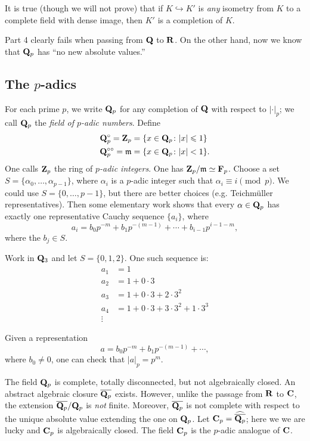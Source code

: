 It is true (though we will not prove) that if $K\hookrightarrow K'$ is 
\emph{any} isometry from $K$ to a complete field with dense image, then $K'$ is 
a completion of $K$. 

Part 4 clearly fails when passing from $\mathbf{Q}$ to $\mathbf{R}$. On the other hand, now 
we know that $\mathbf{Q}_p$ has ``no new absolute values.'' 





\subsection{The \texorpdfstring{$p$}{p}-adics}

For each prime $p$, we write $\mathbf{Q}_p$ for any completion of $\mathbf{Q}$ with respect 
to $|\cdot|_p$; we call $\mathbf{Q}_p$ the \emph{field of $p$-adic numbers}. Define 
\begin{align*}
  \mathbf{Q}_p^\circ = \mathbf{Z}_p &= \{x\in \mathbf{Q}_p\colon |x|\leqslant 1\} \\
  \mathbf{Q}_p^{\circ\circ} = \mathfrak{m} &= \{x\in \mathbf{Q}_p\colon |x|<1\} .
\end{align*}
One calls $\mathbf{Z}_p$ the ring of \emph{$p$-adic integers}. One has 
$\mathbf{Z}_p/\mathfrak{m}\simeq \mathbf{F}_p$. Choose a 
set $S=\{\alpha_0,\dots,\alpha_{p-1}\}$, where $\alpha_i$ is a $p$-adic integer 
such that $\alpha_i\equiv i\pmod p$. We could use $S=\{0,\dots,p-1\}$, but 
there are better choices (e.g. Teichm\"uller representatives). Then some 
elementary work shows that every $\alpha\in \mathbf{Q}_p$ has exactly one 
representative Cauchy sequence $\{a_i\}$, where 
\[
  a_i = b_0 p^{-m} + b_1 p^{-(m-1)} + \cdots + b_{i-1} p^{i-1-m} ,
\]
where the $b_j\in S$. 

\begin{example}
Work in $\mathbf{Q}_3$ and let $S=\{0,1,2\}$. One such sequence is: 
\begin{align*}
  a_1 &= 1 \\
  a_2 &= 1+0\cdot 3 \\
  a_3 &= 1+0\cdot 3+2\cdot 3^2 \\
  a_4 &= 1+0\cdot 3+3\cdot 3^2 + 1\cdot 3^3 \\
  \vdots &
\end{align*}
\end{example}

Given a representation 
\[
  a = b_0 p^{-m} + b_1 p^{-(m-1)} + \cdots ,
\]
where $b_0\ne 0$, one can check that $|a|_p = p^m$. 

The field $\mathbf{Q}_p$ is complete, totally disconnected, but not algebraically 
closed. An abstract algebraic closure $\overline{\mathbf{Q}_p}$ exists. However, 
unlike the passage from $\mathbf{R}$ to $\mathbf{C}$, the extension $\overline{\mathbf{Q}_p}/\mathbf{Q}_p$ 
is \emph{not} finite. Moreover, $\overline{\mathbf{Q}_p}$ is not complete with respect 
to the unique absolute value extending the one on $\mathbf{Q}_p$. Let 
$\mathbf{C}_p=\widehat{\overline{\mathbf{Q}_p}}$; here we we are lucky and $\mathbf{C}_p$ is 
algebraically closed. The field $\mathbf{C}_p$ is the $p$-adic analogue of $\mathbf{C}$. 





